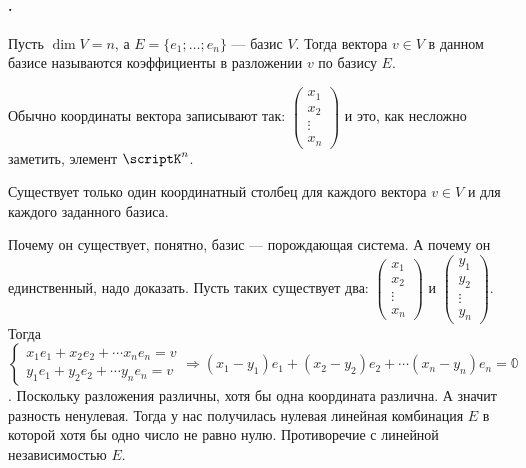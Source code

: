 \documentclass{article}
\begin{document}
    \paragraph{.}
    \begin{itemize}
        \dfn Пусть $\dim V=n$, а $E=\{e_1;\ldots;e_n\}$ --- базис $V$. Тогда  вектора $v\in V$ в данном базисе называются коэффициенты в разложении $v$ по базису $E$.
        \begin{Comment}
            Обычно координаты вектора записывают так: $\left(\begin{matrix}
                x_1\\
                x_2\\
                \vdots\\
                x_n
            \end{matrix}\right)$ и это, как несложно заметить, элемент $\scriptK^n$.
        \end{Comment}
        \thm Существует только один координатный столбец для каждого вектора $v\in V$ и для каждого заданного базиса.
        \begin{Proof}
            Почему он существует, понятно, базис --- порождающая система. А почему он единственный, надо доказать. Пусть таких существует два:
            $\left(\begin{matrix}
                x_1\\
                x_2\\
                \vdots\\
                x_n
            \end{matrix}\right)$
            и
            $\left(\begin{matrix}
                y_1\\
                y_2\\
                \vdots\\
                y_n
            \end{matrix}\right)$. Тогда $\left\{\begin{aligned}
                x_1e_1+x_2e_2+\cdots x_ne_n=v\\
                y_1e_1+y_2e_2+\cdots y_ne_n=v
            \end{aligned}\right.\Rightarrow (x_1-y_1)e_1+(x_2-y_2)e_2+\cdots (x_n-y_n)e_n=\mathbb0$. Поскольку разложения различны, хотя бы одна координата различна. А значит разность ненулевая. Тогда у нас получилась нулевая линейная комбинация $E$ в которой хотя бы одно число не равно нулю. Противоречие с линейной независимостью $E$.

\end{Proof}
\end{itemize}
\end{document}
